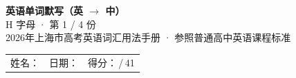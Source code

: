 \documentclass[10pt,a4paper]{article}
\begin{document}
\pagestyle{plain}

\begin{center}
{\LARGE\bfseries 英语单词默写（英 $\to$ 中）}\\[0.22em]
{\large H 字母 · 第 1 / 4 份}\\[0.18em]
{\small 2026年上海市高考英语词汇用法手册 · 参照普通高中英语课程标准}
\end{center}

\vspace{0.25em}
\noindent\begin{tabular}{@{}p{}@{}p{}@{}p{}@{}}
姓名：\underline{\hspace{2.0cm}} & 日期：\underline{\hspace{2.0cm}} & 得分：\underline{\hspace{1.3cm}}\,/\,41 \\
\end{tabular}

\vspace{0.3em}

\vspace{0.08em}
\end{document}
